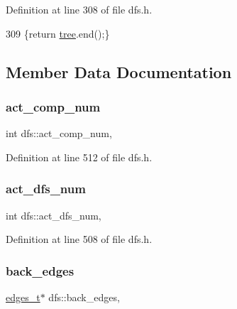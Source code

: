 Definition at line 308 of file dfs.\+h.


\begin{DoxyCode}
309     \{\textcolor{keywordflow}{return} \mbox{\hyperlink{classdfs_aed496b618a937723bfec0b463e17e8d5}{tree}}.end();\}
\end{DoxyCode}


\subsection{Member Data Documentation}
\mbox{\label{classdfs_ab0251ac30adfd569e214a64db7f3a905}} 
\subsubsection{\texorpdfstring{act\+\_\+comp\+\_\+num}{act\_comp\_num}}
{\footnotesize\ttfamily int dfs\+::act\+\_\+comp\+\_\+num\hspace{0.3cm}{\ttfamily [protected]}, {\ttfamily [inherited]}}



Definition at line 512 of file dfs.\+h.

\mbox{\label{classdfs_aedaf2b485ff83150b1de6c305922473b}} 
\subsubsection{\texorpdfstring{act\+\_\+dfs\+\_\+num}{act\_dfs\_num}}
{\footnotesize\ttfamily int dfs\+::act\+\_\+dfs\+\_\+num\hspace{0.3cm}{\ttfamily [protected]}, {\ttfamily [inherited]}}



Definition at line 508 of file dfs.\+h.

\mbox{\label{classdfs_a1dc18a7df8d6b238d5301c92fc7540fa}} 
\subsubsection{\texorpdfstring{back\+\_\+edges}{back\_edges}}
{\footnotesize\ttfamily \mbox{\hyperlink{edge_8h_a8f9587479bda6cf612c103494b3858e3}{edges\+\_\+t}}$\ast$ dfs\+::back\+\_\+edges\hspace{0.3cm}{\ttfamily [protected]}, {\ttfamily [inherited]}}



